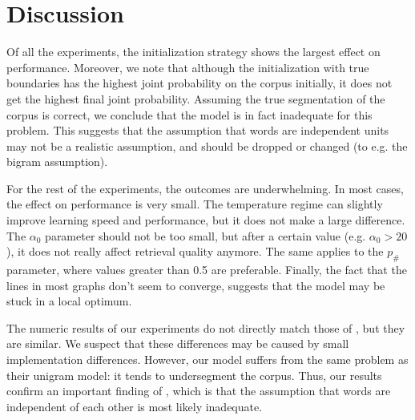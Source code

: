 \section{Discussion}

Of all the experiments, the initialization strategy shows the largest effect on performance. Moreover, we note that although the initialization with true boundaries has the highest joint probability on the corpus initially, it does not get the highest final joint probability. Assuming the true segmentation of the corpus is correct, we conclude that the model is in fact inadequate for this problem. This suggests that the assumption that words are independent units may not be a realistic assumption, and should be dropped or changed (to e.g. the bigram assumption).

For the rest of the experiments, the outcomes are underwhelming. In most cases, the effect on performance is very small. The temperature regime can slightly improve learning speed and performance, but it does not make a large difference. The $\alpha_0$ parameter should not be too small, but after a certain value (e.g. $\alpha_0 > 20$), it does not really affect retrieval quality anymore. The same applies to the $p_\#$ parameter, where values greater than 0.5 are preferable. Finally, the fact that the lines in most graphs don't seem to converge, suggests that the model may be stuck in a local optimum.

The numeric results of our experiments do not directly match those of \cite{Goldwater200921}, but they are similar. We suspect that these differences may be caused by small implementation differences. However, our model suffers from the same problem as their unigram model: it tends to undersegment the corpus. Thus, our results confirm an important finding of \cite{Goldwater200921}, which is that the assumption that words are independent of each other is most likely inadequate.

